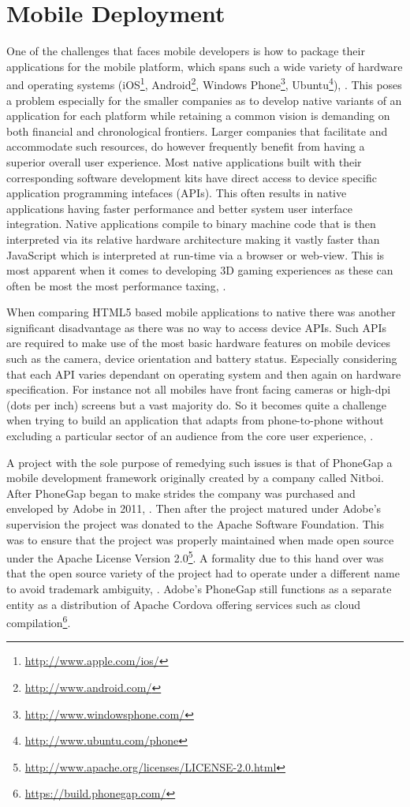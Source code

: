 \documentclass[final]{cmpreport}
\begin{document}
\section{Mobile Deployment}
One of the challenges that faces mobile developers is how to package their applications for the mobile platform, which spans such a wide variety of hardware and operating systems (iOS\footnote{\url{http://www.apple.com/ios/}}, Android\footnote{\url{http://www.android.com/}}, Windows Phone\footnote{\url{http://www.windowsphone.com/}}, Ubuntu\footnote{\url{http://www.ubuntu.com/phone}}), \cite{Feijoo}. This poses a problem especially for the smaller companies as to develop native variants of an application for each platform while retaining a common vision is demanding on both financial and chronological frontiers. Larger companies that facilitate and accommodate such resources, do however frequently benefit from having a superior overall user experience. Most native applications built with their corresponding software development kits have direct access to device specific  application programming intefaces (APIs). This often results in native applications having faster performance and better system user interface integration. Native applications compile to binary machine code that is then interpreted via its relative hardware architecture making it vastly faster than JavaScript which is interpreted at run-time via a browser or web-view. This is most apparent when it comes to developing 3D gaming experiences as these can often be most the most performance taxing, \cite{Kulloli}.

When comparing HTML5 based mobile applications to native there was another significant disadvantage as there was no way to access device APIs. Such APIs are required to make use of the most basic hardware features on mobile devices such as the camera, device orientation and battery status. Especially considering that each API varies dependant on operating system and then again on hardware specification. For instance not all mobiles have front facing cameras or high-dpi (dots per inch) screens but a vast majority do. So it becomes quite a challenge when trying to build an application that adapts from phone-to-phone without excluding a particular sector of an audience from the core user experience, \cite{Charland}.

A project with the sole purpose of remedying such issues is that of PhoneGap a mobile development framework originally created by a company called Nitboi. After PhoneGap began to make strides the company was purchased and enveloped by Adobe in 2011, \cite{Adobe}. Then after the project matured under Adobe's supervision the project was donated to the Apache Software Foundation. This was to ensure that the project was properly maintained when made open source under the Apache License Version 2.0\footnote{\url{http://www.apache.org/licenses/LICENSE-2.0.html}}. A formality due to this hand over was that the open source variety of the project had to operate under a different name to avoid trademark ambiguity, \cite{Leroux}. Adobe's PhoneGap still functions as a separate entity as a distribution of Apache Cordova offering services such as cloud compilation\footnote{\url{https://build.phonegap.com/}}.
\end{document}
